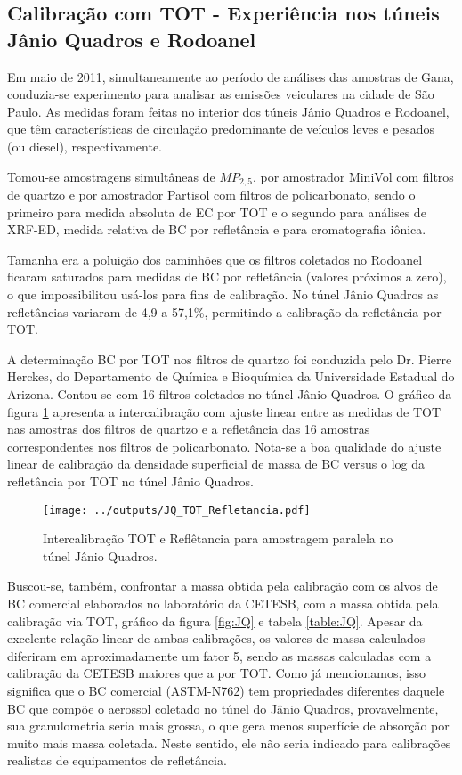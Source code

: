 \newpage
\subsection{Calibração com TOT - Experiência nos túneis Jânio Quadros e Rodoanel}

Em maio de 2011, simultaneamente ao período de análises das amostras de Gana, 
conduzia-se experimento para analisar as emissões veiculares na cidade de São 
Paulo. As medidas foram feitas no interior dos túneis Jânio Quadros e Rodoanel,
que têm características de circulação predominante de veículos leves e pesados 
(ou diesel), respectivamente. 

Tomou-se amostragens simultâneas de $MP_{2,5}$, por amostrador MiniVol com 
filtros de quartzo e por amostrador Partisol com filtros de policarbonato, 
sendo o primeiro para medida absoluta de EC por TOT e o segundo para análises
de XRF-ED, medida relativa de BC por refletância e para cromatografia iônica.

Tamanha era a poluição dos caminhões que os filtros coletados no Rodoanel 
ficaram saturados para medidas de BC por refletância (valores próximos a zero), 
o que impossibilitou usá-los para fins de calibração. No túnel Jânio Quadros as 
refletâncias variaram de 4,9 a 57,1\%, permitindo a calibração da refletância 
por TOT.

A determinação BC por TOT nos filtros de quartzo foi conduzida pelo Dr. Pierre 
Herckes, do Departamento de Química e Bioquímica da Universidade Estadual do 
Arizona. Contou-se com 16 filtros coletados no túnel Jânio Quadros. 
O gráfico da figura \ref{table:interJQ} apresenta a intercalibração com ajuste 
linear entre as medidas de TOT nas amostras dos filtros de quartzo e a 
refletância das 16 amostras correspondentes nos filtros de policarbonato.
Nota-se a boa qualidade do ajuste linear de calibração da densidade superficial 
de massa de BC versus o log da refletância por TOT no túnel Jânio Quadros. 

\begin{figure}[H]
  \centering
  \texttt{[image: ../outputs/JQ\_TOT\_Refletancia.pdf]}
  \caption{Intercalibração TOT e Reflêtancia para amostragem paralela no 
           túnel Jânio Quadros. \label{table:interJQ}}
\end{figure}

Buscou-se, também, confrontar a massa obtida pela calibração com os  
alvos de BC comercial elaborados no laboratório da CETESB, com a massa 
obtida pela calibração via TOT, gráfico da figura \ref{fig:JQ} e tabela
\ref{table:JQ}. Apesar da excelente relação linear de ambas calibrações, os 
valores de massa calculados diferiram em aproximadamente um fator 5, sendo as 
massas calculadas com a calibração da CETESB maiores que a por TOT.  
Como já mencionamos, isso significa que o BC comercial (ASTM-N762) tem 
propriedades diferentes daquele BC que compõe o aerossol coletado no túnel do 
Jânio Quadros, provavelmente, sua granulometria seria mais grossa, o que gera 
menos superfície de absorção por muito mais massa coletada. Neste sentido, ele 
não seria indicado para calibrações realistas de equipamentos de refletância. 

